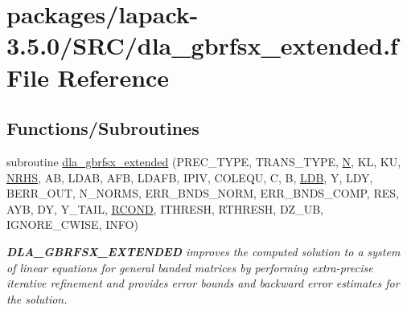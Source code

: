 \hypertarget{dla__gbrfsx__extended_8f}{}\section{packages/lapack-\/3.5.0/\+S\+R\+C/dla\+\_\+gbrfsx\+\_\+extended.f File Reference}
\label{dla__gbrfsx__extended_8f}
\subsection*{Functions/\+Subroutines}
\begin{DoxyCompactItemize}
\item 
subroutine \hyperlink{group__doubleGBcomputational_ga1520b1b9984236f0315d6fc077e4eb04}{dla\+\_\+gbrfsx\+\_\+extended} (P\+R\+E\+C\+\_\+\+T\+Y\+P\+E, T\+R\+A\+N\+S\+\_\+\+T\+Y\+P\+E, \hyperlink{polmisc_8c_a0240ac851181b84ac374872dc5434ee4}{N}, K\+L, K\+U, \hyperlink{example__user_8c_aa0138da002ce2a90360df2f521eb3198}{N\+R\+H\+S}, A\+B, L\+D\+A\+B, A\+F\+B, L\+D\+A\+F\+B, I\+P\+I\+V, C\+O\+L\+E\+Q\+U, C, B, \hyperlink{example__user_8c_a50e90a7104df172b5a89a06c47fcca04}{L\+D\+B}, Y, L\+D\+Y, B\+E\+R\+R\+\_\+\+O\+U\+T, N\+\_\+\+N\+O\+R\+M\+S, E\+R\+R\+\_\+\+B\+N\+D\+S\+\_\+\+N\+O\+R\+M, E\+R\+R\+\_\+\+B\+N\+D\+S\+\_\+\+C\+O\+M\+P, R\+E\+S, A\+Y\+B, D\+Y, Y\+\_\+\+T\+A\+I\+L, \hyperlink{superlu__enum__consts_8h_af00a42ecad444bbda75cde1b64bd7e72a9b5c151728d8512307565994c89919d5}{R\+C\+O\+N\+D}, I\+T\+H\+R\+E\+S\+H, R\+T\+H\+R\+E\+S\+H, D\+Z\+\_\+\+U\+B, I\+G\+N\+O\+R\+E\+\_\+\+C\+W\+I\+S\+E, I\+N\+F\+O)
\begin{DoxyCompactList}\small\item\em {\bfseries D\+L\+A\+\_\+\+G\+B\+R\+F\+S\+X\+\_\+\+E\+X\+T\+E\+N\+D\+E\+D} improves the computed solution to a system of linear equations for general banded matrices by performing extra-\/precise iterative refinement and provides error bounds and backward error estimates for the solution. \end{DoxyCompactList}\end{DoxyCompactItemize}
